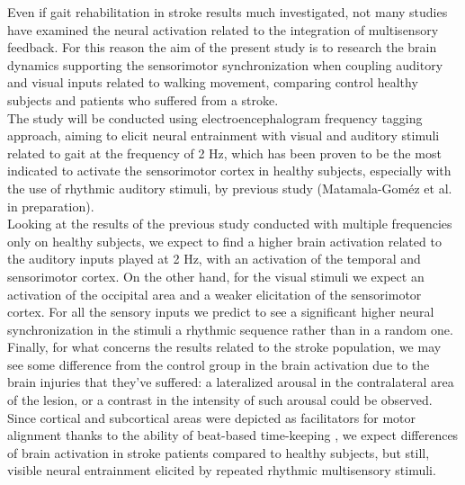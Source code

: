 Even if gait rehabilitation in stroke results much investigated, not many studies have examined the neural activation related to the integration of multisensory feedback. For this reason the aim of the present study is to research the brain dynamics supporting the sensorimotor synchronization when coupling auditory and visual inputs related to walking movement, comparing control healthy subjects and patients who suffered from a stroke. \\
The study will be conducted using electroencephalogram frequency tagging approach, aiming to elicit neural entrainment with visual and auditory stimuli related to gait at the frequency of 2 Hz, which has been proven to be the most indicated to activate the sensorimotor cortex in healthy subjects, especially with the use of rhythmic auditory stimuli, by previous study (Matamala-Goméz et al. in preparation).\\
Looking at the results of the previous study conducted with multiple frequencies only on healthy subjects, we expect to find a higher brain activation related to the auditory inputs played at 2 Hz, with an activation of the temporal and sensorimotor cortex. On the other hand, for the visual stimuli we expect an activation of the occipital area and a weaker elicitation of the sensorimotor cortex. For all the sensory inputs we predict to see a significant higher neural synchronization in the stimuli a rhythmic sequence rather than in a random one. \\
Finally, for what concerns the results related to the stroke population, we may see some difference from the control group in the brain activation due to the brain injuries that they've suffered: a lateralized arousal in the contralateral area of the lesion, or a contrast in the intensity of such arousal could be observed. \\
Since cortical and subcortical areas were depicted as facilitators for motor alignment thanks to the ability of beat-based time-keeping \parencite{Cannon_2021}, we expect differences of brain activation in stroke patients compared to healthy subjects, but still, visible neural entrainment elicited by repeated rhythmic multisensory stimuli. 

